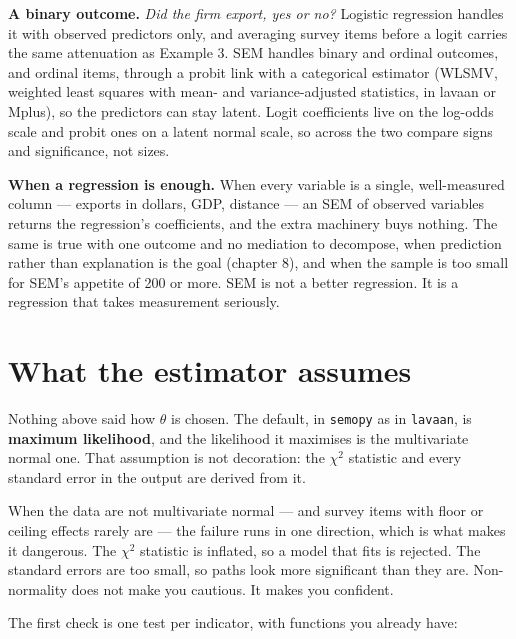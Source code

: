 \documentclass[
  letterpaper,
  10pt,
  twoside,
  openright,
  numbers=noenddot,
  chapterprefix=true]{scrbook}
\begin{document}
\textbf{A binary outcome.} \emph{Did the firm export, yes or no?}
Logistic regression handles it with observed predictors only, and
averaging survey items before a logit carries the same attenuation as
Example 3. SEM handles binary and ordinal outcomes, and ordinal items,
through a probit link with a categorical estimator (WLSMV, weighted
least squares with mean- and variance-adjusted statistics, in lavaan or
Mplus), so the predictors can stay latent. Logit coefficients live on
the log-odds scale and probit ones on a latent normal scale, so across
the two compare signs and significance, not sizes.

\textbf{When a regression is enough.} When every variable is a single,
well-measured column --- exports in dollars, GDP, distance --- an SEM of
observed variables returns the regression's coefficients, and the extra
machinery buys nothing. The same is true with one outcome and no
mediation to decompose, when prediction rather than explanation is the
goal (chapter 8), and when the sample is too small for SEM's appetite of
200 or more. SEM is not a better regression. It is a regression that
takes measurement seriously.

\section{What the estimator assumes}\label{what-the-estimator-assumes}

Nothing above said how \(\theta\) is chosen. The default, in
\texttt{semopy} as in \texttt{lavaan}, is \textbf{maximum likelihood},
and the likelihood it maximises is the multivariate normal one. That
assumption is not decoration: the \(\chi^2\) statistic and every
standard error in the output are derived from it.

When the data are not multivariate normal --- and survey items with
floor or ceiling effects rarely are --- the failure runs in one
direction, which is what makes it dangerous. The \(\chi^2\) statistic is
inflated, so a model that fits is rejected. The standard errors are too
small, so paths look more significant than they are. Non-normality does
not make you cautious. It makes you confident.

The first check is one test per indicator, with functions you already
have:
\end{document}
